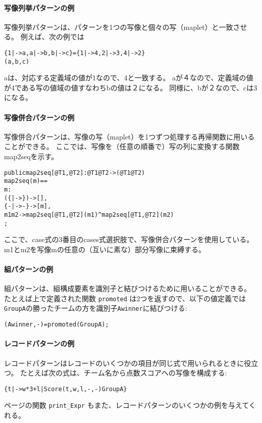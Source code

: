 \documentclass[\pformat,12pt]{jarticle}
\begin{document}
\begin{description}
\paragraph{写像列挙パターンの例}
写像列挙パターンは、パターンを1つの写像と個々の写（maplet）と一致させる。
例えば、次の例では

\begin{alltt}
  \{1 |-> a, a |-> b, b |-> c\} = \{1 |-> 4, 2 |-> 3, 4 |-> 2\} 
  (a, b, c)
\end{alltt}
aは、対応する定義域の値が1なので、4と一致する。
aが４なので、定義域の値が4である写の値域の値すなわちbの値は２になる。
同様に、bが２なので、cは3になる。

\paragraph{写像併合パターンの例}
写像併合パターンは、写像の写（maplet）を1つずつ処理する再帰関数に用いることができる。
ここでは、写像を（任意の順番で）写の列に変換する関数map2seqを示す。

\begin{alltt}
public map2seq[@T1, @T2] :  @T1  @T2 ->  ( @T1  @T2)
map2seq(m) ==
   m:
    (\{|->\})	-> [],
    \{- |-> -\}	-> [m],
    m1  m2 -> map2seq[@T1, @T2] (m1) ^  map2seq[@T1, @T2] (m2)
  ;
\end{alltt}

ここで、case式の3番目のcases式選択肢で、写像併合パターンを使用している。
m1とm2を写像mの任意の（互いに素な）部分写像に束縛する。

\paragraph{組パターンの例}
組パターンは、組構成要素を識別子と結びつけるために用いることができる。
たとえば上で定義された関数 \texttt{promoted} は2つを返すので、以下の値定義では \texttt{GroupA}の勝ったチームの方を識別子\texttt{Awinner}に結びつける:
\begin{alltt}

    (Awinner,-) = promoted(GroupA);
\end{alltt}

\paragraph{レコードパターンの例}
レコードパターンはレコードのいくつかの項目が同じ式で用いられるときに役立つ。
たとえば次の式は、チーム名から点数スコアへの写像を構成する:
\begin{alltt}
  \{ t |-> w * 3 + l | Score(t,w,l,-,-)  GroupA\}
\end{alltt}
 \pageref{printExprDef}ページの関数 \texttt{print\_Expr} もまた、レコードパターンのいくつかの例を与えてくれる。


\end{description}
\end{document}

